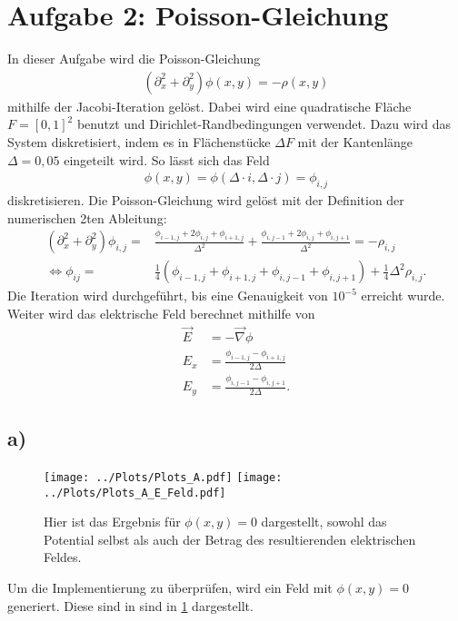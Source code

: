 
\section*{Aufgabe 2: Poisson-Gleichung}
In dieser Aufgabe wird die Poisson-Gleichung
\begin{align}
	\left( \partial_x^2+\partial_y^2 \right)\phi(x,y)=-\rho(x,y)
\end{align}
mithilfe der Jacobi-Iteration gelöst.
Dabei wird eine quadratische Fläche $F=[0,1]^2$ benutzt und Dirichlet-Randbedingungen verwendet.
Dazu wird das System diskretisiert, indem es in Flächenstücke $\Delta F$ mit der Kantenlänge $\Delta = 0,05$ eingeteilt wird.
So lässt sich das Feld 
\begin{align}
\phi(x ,y)=\phi(\Delta\cdot i , \Delta \cdot j)=\phi_{i,j}
\end{align}
diskretisieren.
Die Poisson-Gleichung wird gelöst mit der Definition der numerischen 2ten Ableitung:
\begin{align}
	(\partial_x^2+\partial_y^2)\phi_{i,j}=&\frac{\phi_{i-1,j}+2\phi_{i,j}+\phi_{i+1,j}}{\Delta^2}+\frac{\phi_{i,j-1}+2\phi_{i,j}+\phi_{i,j+1}}{\Delta^2}=-\rho_{i,j}\\
	\Leftrightarrow\phi_{ij}=&\frac{1}{4}\left(\phi_{i-1,j}+\phi_{i+1,j}+\phi_{i,j-1}+\phi_{i,j+1}\right)+\frac{1}{4}\Delta^2 \rho_{i,j}.
\end{align}
Die Iteration wird durchgeführt, bis eine Genauigkeit von $10^{-5}$ erreicht wurde.
Weiter wird das elektrische Feld berechnet mithilfe von
\begin{align}
	\vec{E} &= -\vec{\nabla} \phi\\
	E_x&=\frac{\phi_{i-1,j}-\phi_{i+1,j}}{2\Delta}\\
	E_y&=\frac{\phi_{i,j-1}-\phi_{i,j+1}}{2\Delta}.
\end{align}
\newpage
\subsection*{a)}
\begin{figure}[h!]
	\centering
	\texttt{[image: ../Plots/Plots\_A.pdf]}
	\texttt{[image: ../Plots/Plots\_A\_E\_Feld.pdf]}
	\caption{Hier ist das Ergebnis für $\phi(x,y)=0$ dargestellt, sowohl das Potential selbst als auch der Betrag des resultierenden elektrischen Feldes.}\label{fig:Ergebis_a}
\end{figure}
Um die Implementierung zu überprüfen, wird ein Feld mit $\phi(x,y)= 0$ generiert.
Diese sind in  sind in \cref{fig:Ergebis_a} dargestellt.
\newpage
